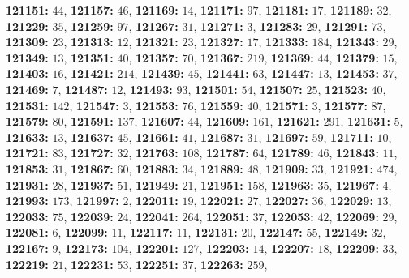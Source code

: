 \textsf{\bfseries 121151:} $44$, \textsf{\bfseries 121157:} $46$, \textsf{\bfseries 121169:} $14$, \textsf{\bfseries 121171:} $97$, \textsf{\bfseries 121181:} $17$, \textsf{\bfseries 121189:} $32$, \textsf{\bfseries 121229:} $35$, \textsf{\bfseries 121259:} $97$, \textsf{\bfseries 121267:} $31$, \textsf{\bfseries 121271:} $3$, \textsf{\bfseries 121283:} $29$, \textsf{\bfseries 121291:} $73$, \textsf{\bfseries 121309:} $23$, \textsf{\bfseries 121313:} $12$, \textsf{\bfseries 121321:} $23$, \textsf{\bfseries 121327:} $17$, \textsf{\bfseries 121333:} $184$, \textsf{\bfseries 121343:} $29$, \textsf{\bfseries 121349:} $13$, \textsf{\bfseries 121351:} $40$, \textsf{\bfseries 121357:} $70$, \textsf{\bfseries 121367:} $219$, \textsf{\bfseries 121369:} $44$, \textsf{\bfseries 121379:} $15$, \textsf{\bfseries 121403:} $16$, \textsf{\bfseries 121421:} $214$, \textsf{\bfseries 121439:} $45$, \textsf{\bfseries 121441:} $63$, \textsf{\bfseries 121447:} $13$, \textsf{\bfseries 121453:} $37$, \textsf{\bfseries 121469:} $7$, \textsf{\bfseries 121487:} $12$, \textsf{\bfseries 121493:} $93$, \textsf{\bfseries 121501:} $54$, \textsf{\bfseries 121507:} $25$, \textsf{\bfseries 121523:} $40$, \textsf{\bfseries 121531:} $142$, \textsf{\bfseries 121547:} $3$, \textsf{\bfseries 121553:} $76$, \textsf{\bfseries 121559:} $40$, \textsf{\bfseries 121571:} $3$, \textsf{\bfseries 121577:} $87$, \textsf{\bfseries 121579:} $80$, \textsf{\bfseries 121591:} $137$, \textsf{\bfseries 121607:} $44$, \textsf{\bfseries 121609:} $161$, \textsf{\bfseries 121621:} $291$, \textsf{\bfseries 121631:} $5$, \textsf{\bfseries 121633:} $13$, \textsf{\bfseries 121637:} $45$, \textsf{\bfseries 121661:} $41$, \textsf{\bfseries 121687:} $31$, \textsf{\bfseries 121697:} $59$, \textsf{\bfseries 121711:} $10$, \textsf{\bfseries 121721:} $83$, \textsf{\bfseries 121727:} $32$, \textsf{\bfseries 121763:} $108$, \textsf{\bfseries 121787:} $64$, \textsf{\bfseries 121789:} $46$, \textsf{\bfseries 121843:} $11$, \textsf{\bfseries 121853:} $31$, \textsf{\bfseries 121867:} $60$, \textsf{\bfseries 121883:} $34$, \textsf{\bfseries 121889:} $48$, \textsf{\bfseries 121909:} $33$, \textsf{\bfseries 121921:} $474$, \textsf{\bfseries 121931:} $28$, \textsf{\bfseries 121937:} $51$, \textsf{\bfseries 121949:} $21$, \textsf{\bfseries 121951:} $158$, \textsf{\bfseries 121963:} $35$, \textsf{\bfseries 121967:} $4$, \textsf{\bfseries 121993:} $173$, \textsf{\bfseries 121997:} $2$, \textsf{\bfseries 122011:} $19$, \textsf{\bfseries 122021:} $27$, \textsf{\bfseries 122027:} $36$, \textsf{\bfseries 122029:} $13$, \textsf{\bfseries 122033:} $75$, \textsf{\bfseries 122039:} $24$, \textsf{\bfseries 122041:} $264$, \textsf{\bfseries 122051:} $37$, \textsf{\bfseries 122053:} $42$, \textsf{\bfseries 122069:} $29$, \textsf{\bfseries 122081:} $6$, \textsf{\bfseries 122099:} $11$, \textsf{\bfseries 122117:} $11$, \textsf{\bfseries 122131:} $20$, \textsf{\bfseries 122147:} $55$, \textsf{\bfseries 122149:} $32$, \textsf{\bfseries 122167:} $9$, \textsf{\bfseries 122173:} $104$, \textsf{\bfseries 122201:} $127$, \textsf{\bfseries 122203:} $14$, \textsf{\bfseries 122207:} $18$, \textsf{\bfseries 122209:} $33$, \textsf{\bfseries 122219:} $21$, \textsf{\bfseries 122231:} $53$, \textsf{\bfseries 122251:} $37$, \textsf{\bfseries 122263:} $259$, 
